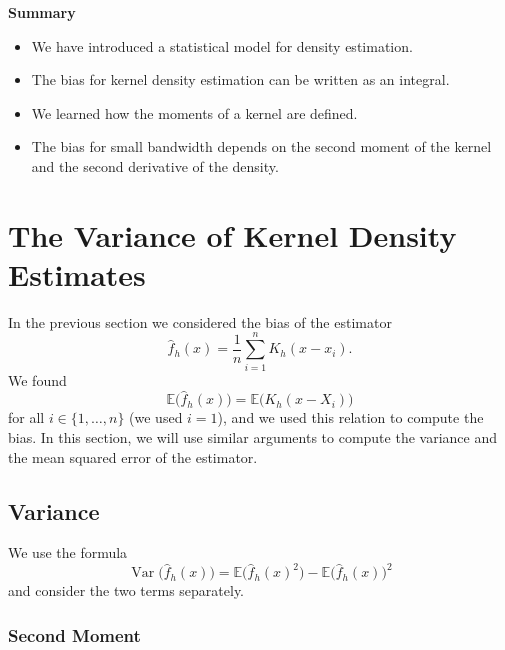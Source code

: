 \documentclass[
  a4paper,
]{article}
\providecommand{\tightlist}{%
  \setlength{\itemsep}{0pt}\setlength{\parskip}{0pt}}
\theoremstyle{definition}
\theoremstyle{definition}
\theoremstyle{definition}
\theoremstyle{definition}
\theoremstyle{remark}
\begin{document}
\textbf{Summary}

\begin{itemize}
\tightlist
\item
  We have introduced a statistical model for density estimation.
\item
  The bias for kernel density estimation can be written as an integral.
\item
  We learned how the moments of a kernel are defined.
\item
  The bias for small bandwidth depends on the second moment of the
  kernel and the second derivative of the density.
\end{itemize}

\clearpage

\hypertarget{X03-Var}{%
\section{The Variance of Kernel Density Estimates}\label{X03-Var}}

In the previous section we considered the bias of the estimator
\begin{equation*}
  \hat f_h(x)
  = \frac{1}{n} \sum_{i=1}^n K_h(x - x_i).
\end{equation*}
We found
\begin{equation}
  \mathbb{E}\bigl( \hat f_h(x) \bigr)
  = \mathbb{E}\bigl( K_h(x - X_i) \bigr)  \label{eq:E-hat-f-K-h}
\end{equation}
for all \(i \in \{1, \ldots, n\}\) (we used \(i=1\)), and we used this relation
to compute the bias. In this section, we will use similar arguments to compute
the variance and the mean squared error of the estimator.

\hypertarget{variance}{%
\subsection{Variance}\label{variance}}

We use the formula
\begin{equation*}
  \mathop{\mathrm{Var}}\bigl( \hat f_h(x) \bigr)
  = \mathbb{E}\bigl( \hat f_h(x)^2 \bigr) - \mathbb{E}\bigl( \hat f_h(x) \bigr)^2
\end{equation*}
and consider the two terms separately.

\hypertarget{second-moment}{%
\subsubsection{Second Moment}\label{second-moment}}
\end{document}
